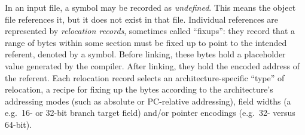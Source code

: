 In an input file, a symbol may be recorded as \emph{undefined}.
This means the object file references it, but it does not exist in that file.
Individual references are represented by \emph{relocation records}, sometimes called 
``fixups'': they record that a range of bytes within some section must be fixed up 
to point to the intended referent, denoted by a symbol.
Before linking, these bytes hold a placeholder value generated by the compiler.
After linking, they hold the encoded address of the referent.
Each relocation record selects an architecture-specific ``type'' of relocation, 
a recipe for fixing up the bytes according to the architecture's
addressing modes (such as absolute or PC-relative addressing),
field widths (a e.g.\ 16- or 32-bit branch target field)
and/or pointer encodings (e.g.\ 32- versus 64-bit).

% 


